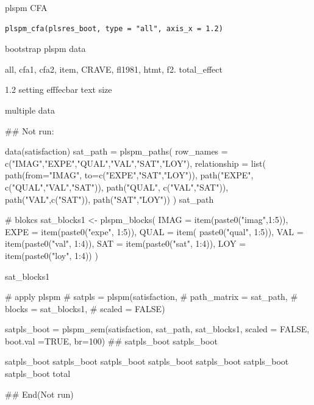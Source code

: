 \documentclass[a4paper]{book}
\begin{document}
%
\begin{Description}
plspm CFA
\end{Description}
%
\begin{Usage}
\begin{verbatim}
plspm_cfa(plsres_boot, type = "all", axis_x = 1.2)
\end{verbatim}
\end{Usage}
%
\begin{Arguments}
\begin{ldescription}
\item[\code{plsres\_boot}] bootstrap plspm data

\item[\code{type}] all, cfa1, cfa2, item, CRAVE, fl1981, htmt, f2. total\_effect

\item[\code{axis\_x}] 1.2 setting efffecbar text size
\end{ldescription}
\end{Arguments}
%
\begin{Value}
multiple data
\end{Value}
%
\begin{Examples}
\begin{ExampleCode}

\#\# Not run: 

data(satisfaction)
sat_path = plspm_paths(
  row_names = c("IMAG","EXPE","QUAL","VAL","SAT","LOY"),
  relationship = list(
    path(from="IMAG", to=c("EXPE","SAT","LOY")),
    path("EXPE", c("QUAL","VAL","SAT")),
    path("QUAL", c("VAL","SAT")),
    path("VAL",c("SAT")),
    path("SAT","LOY"))
)
sat_path

# blokcs
sat_blocks1 <- plspm_blocks(
  IMAG = item(paste0("imag",1:5)),
  EXPE = item(paste0("expe", 1:5)),
  QUAL = item( paste0("qual", 1:5)),
  VAL = item(paste0("val", 1:4)),
  SAT = item(paste0("sat", 1:4)),
  LOY = item(paste0("loy", 1:4))
)

sat_blocks1

# apply plspm
# satpls = plspm(satisfaction,
#                path_matrix = sat_path,
#                blocks = sat_blocks1,
#                scaled = FALSE)

satpls_boot = plspm_sem(satisfaction, sat_path, sat_blocks1, scaled = FALSE,
                        boot.val =TRUE, br=100)
##
satpls_boot%
satpls_boot%

satpls_boot%
satpls_boot%
satpls_boot%
satpls_boot%
satpls_boot%
satpls_boot%
satpls_boot%
total

## End(Not run)


\end{ExampleCode}
\end{Examples}
\end{document}
